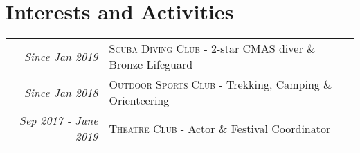 \documentclass[a4paper,10pt]{article} %
\begin{document}



\section{Interests and Activities}
\begin{longtable}{r|l}
\emph{Since Jan 2019} & \textsc{Scuba Diving Club} - 2-star CMAS diver \& Bronze Lifeguard\\
\emph{Since Jan 2018} & \textsc{Outdoor Sports Club} - Trekking, Camping \& Orienteering\\
\emph{Sep 2017 - June 2019} & \textsc{Theatre Club} - Actor \& Festival Coordinator
\end{longtable}


\end{document}
